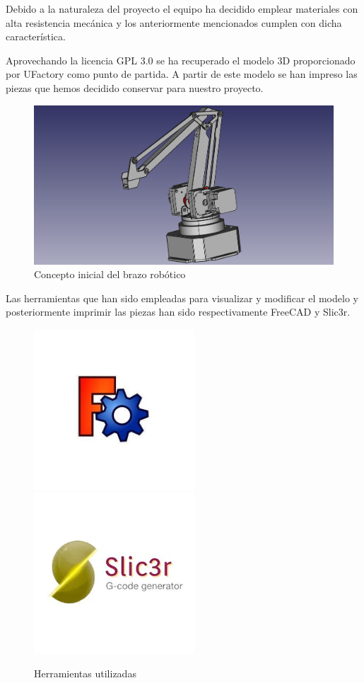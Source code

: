 Debido a la naturaleza del proyecto el equipo ha decidido emplear materiales con alta resistencia mecánica y los anteriormente mencionados cumplen con dicha característica.

Aprovechando la licencia GPL 3.0 se ha recuperado el modelo 3D proporcionado por UFactory como punto de partida. A partir de este modelo se han impreso las piezas que hemos decidido conservar para nuestro proyecto.

\begin{figure}[H]
    \centering
    \includegraphics[width=12cm]{pictures/brazo_vista_3d_inicial.png}
    \caption{Concepto inicial del brazo robótico}
    \label{fig:manipulador_inicial}
\end{figure}

Las herramientas que han sido empleadas para visualizar y modificar el modelo y posteriormente imprimir las piezas han sido respectivamente FreeCAD y Slic3r.

\begin{figure}[H]
    \centering
    \includegraphics[width=6cm]{pictures/freeCAD.jpg}
    \includegraphics[width=6cm]{pictures/slic3r_logo.jpg}
    \caption{Herramientas utilizadas}
    \label{fig:herramientas_3d}
\end{figure}

